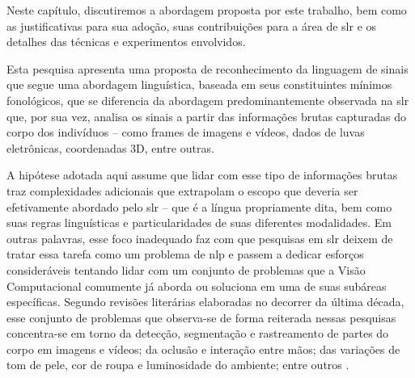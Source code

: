 Neste capítulo, discutiremos a abordagem proposta por este trabalho, bem como as justificativas para sua adoção, suas contribuições para a área de \acrshort{slr} e os detalhes das técnicas e experimentos envolvidos.

Esta pesquisa apresenta uma proposta de reconhecimento da linguagem de sinais que segue uma abordagem linguística, baseada em seus constituintes mínimos fonológicos, que se diferencia da abordagem predominantemente observada na \acrshort{slr} que, por sua vez, analisa os sinais a partir das informações brutas capturadas do corpo dos indivíduos -- como frames de imagens e vídeos, dados de luvas eletrônicas, coordenadas 3D, entre outras.

A hipótese adotada aqui assume que lidar com esse tipo de informações brutas traz complexidades adicionais que extrapolam o escopo que deveria ser efetivamente abordado pelo \acrshort{slr} -- que é a língua propriamente dita, bem como suas regras linguísticas e particularidades de suas diferentes modalidades. 
Em outras palavras, esse foco inadequado faz com que pesquisas em \acrshort{slr} deixem de tratar essa tarefa como um problema de  \acrfull{nlp} e passem a dedicar esforços consideráveis tentando lidar com um conjunto de problemas que a Visão Computacional comumente já aborda ou soluciona em uma de suas subáreas específicas. 
Segundo revisões literárias elaboradas no decorrer da última década, esse conjunto de problemas que observa-se de forma reiterada nessas pesquisas concentra-se em torno da detecção, segmentação e rastreamento de partes do corpo em imagens e vídeos; da oclusão e interação entre mãos; das variações de tom de pele, cor de roupa e luminosidade do ambiente; entre outros \cite{papastratis-2021-ai-technologies-sl,rastgoo-2021-slr-deep-survey,koller-2020-quantitative-survey-slr,bragg-2019-slr-interdisciplinary,wadhawan-2019-slr-literature-review,suharjito-2018-feature-extraction-survey,joksimoski-2022-scoping-review,cooper-2011-slr}.




